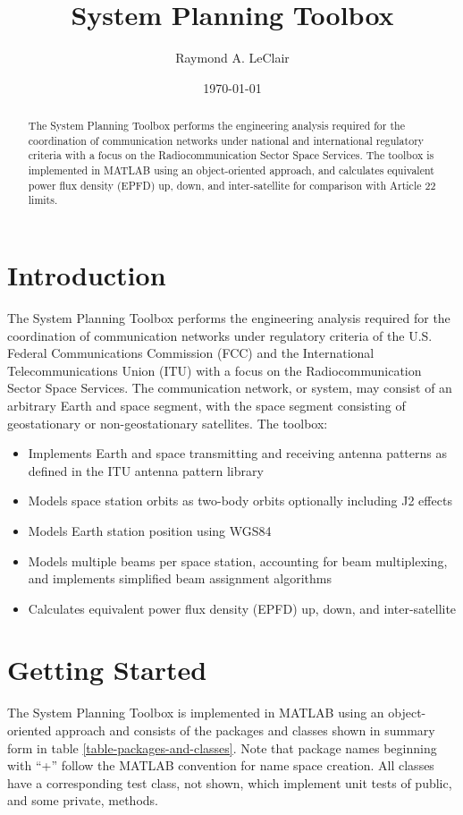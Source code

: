 \documentclass[11pt]{article}
\title{System Planning Toolbox}
\author{Raymond A. LeClair}
\date{\today}
\begin{document}
\maketitle

\begin{abstract}
The System Planning Toolbox performs the engineering analysis required
for the coordination of communication networks under national and
international regulatory criteria with a focus on the
Radiocommunication Sector Space Services.  The toolbox is implemented
in MATLAB using an object-oriented approach, and calculates equivalent
power flux density (EPFD) up, down, and inter-satellite for comparison
with Article 22 limits.
\end{abstract}

\section{Introduction}

The System Planning Toolbox performs the engineering analysis required
for the coordination of communication networks under regulatory
criteria of the U.S. Federal Communications Commission (FCC) and the
International Telecommunications Union (ITU) with a focus on the
Radiocommunication Sector Space Services. The communication network,
or system, may consist of an arbitrary Earth and space segment, with
the space segment consisting of geostationary or non-geostationary
satellites. The toolbox:
\begin{itemize}
\item Implements Earth and space transmitting and receiving antenna
  patterns as defined in the ITU antenna pattern library
\item Models space station orbits as two-body orbits optionally
  including J2 effects
\item Models Earth station position using WGS84
\item Models multiple beams per space station, accounting for beam
  multiplexing, and implements simplified beam assignment algorithms
\item Calculates equivalent power flux density (EPFD) up, down, and
  inter-satellite
\end{itemize}

\section{Getting Started}

The System Planning Toolbox is implemented in MATLAB using an
object-oriented approach and consists of the packages and classes
shown in summary form in table \ref{table-packages-and-classes}. Note
that package names beginning with “+” follow the MATLAB convention for
name space creation. All classes have a corresponding test class, not
shown, which implement unit tests of public, and some private,
methods.
\end{document}
